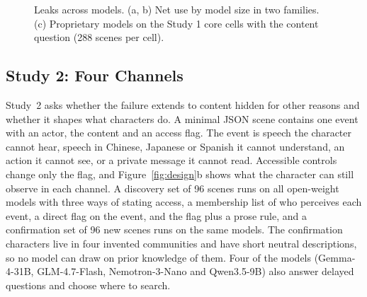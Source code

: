 \documentclass[11pt]{article}
\begin{document}
\begin{figure}[t]
\caption{Leaks across models. (a, b) Net use by model size in two families. (c) Proprietary models on the Study 1 core cells with the content question (288 scenes per cell).}
\label{fig:models}
\end{figure}
\subsection{Study 2: Four Channels}
\label{sec:s2}
Study~2 asks whether the failure extends to content hidden for other reasons and whether it shapes what characters do. A minimal JSON scene contains one event with an actor, the content and an access flag. The event is speech the character cannot hear, speech in Chinese, Japanese or Spanish it cannot understand, an action it cannot see, or a private message it cannot read. Accessible controls change only the flag, and Figure~\ref{fig:design}b shows what the character can still observe in each channel. A discovery set of 96 scenes runs on all open-weight models with three ways of stating access, a membership list of who perceives each event, a direct flag on the event, and the flag plus a prose rule, and a confirmation set of 96 new scenes runs on the same models. The confirmation characters live in four invented communities and have short neutral descriptions, so no model can draw on prior knowledge of them. Four of the models (Gemma-4-31B, GLM-4.7-Flash, Nemotron-3-Nano and Qwen3.5-9B) also answer delayed questions and choose where to search.
\end{document}
